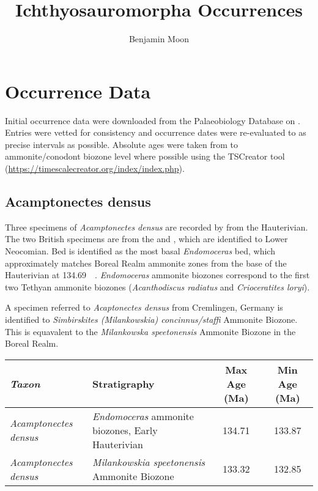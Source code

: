 \documentclass[british]{article}
\title{Ichthyosauromorpha Occurrences}
\author{Benjamin Moon}
\date{\printdate{2020-03-10}\sidenote{Version~\version}}
\begin{document}
\maketitle

\tableofcontents

\section{Occurrence Data}%
\label{sec:occurrence-data}

Initial occurrence data were downloaded from the Palaeobiology Database on
. Entries were vetted for consistency and occurrence dates
were re-evaluated to as precise intervals as possible. Absolute ages were  taken
from \textcite{Ogg2016} to ammonite/conodont biozone level where possible using
the TSCreator tool (\url{https://timescalecreator.org/index/index.php}).

\subsection{Acamptonectes densus}%
\label{sub:acamptonectes-densus}

Three specimens of \emph{Acamptonectes densus} are recorded by
\textcite{Fischer2012PO} from the Hauterivian. The two British specimens are
from the  and , which are identified to Lower
Neocomian. Bed  is identified as the most basal
\emph{Endomoceras} bed,\autocite{Hopson2008} which approximately matches Boreal
Realm ammonite zones from the base of the Hauterivian at
\SI{134.69}{\mega\annum}.\autocite{Ogg2016ACGTSa} \emph{Endomoceras} ammonite
biozones correspond to the first two Tethyan ammonite biozones
(\emph{Acanthodiscus radiatus} and \emph{Crioceratites loryi}).

A specimen referred to \emph{Acaptonectes densus} from Cremlingen, Germany is
identified to \emph{Simbirskites (Milankowskia) concinnus/staffi} Ammonite
Biozone.\autocite{Siebertz2008BNS} This is equavalent to the \emph{Milankowska
speetonensis} Ammonite Biozone in the Boreal Realm.\autocite{Ogg2016ACGTSa}

\begin{table}[htb]
    \footnotesize
    \begin{tabu}{>{\em}lXSS}
        \toprule
        \emph{Taxon}         & Stratigraphy                                            & {Max Age (Ma)} & {Min Age (Ma)} \\
        \midrule
        Acamptonectes densus & \emph{Endomoceras} ammonite biozones, Early Hauterivian & 134.71         & 133.87         \\
        Acamptonectes densus & \emph{Milankowskia speetonensis} Ammonite Biozone       & 133.32         & 132.85         \\
        \bottomrule
    \end{tabu}
\end{table}
\end{document}
